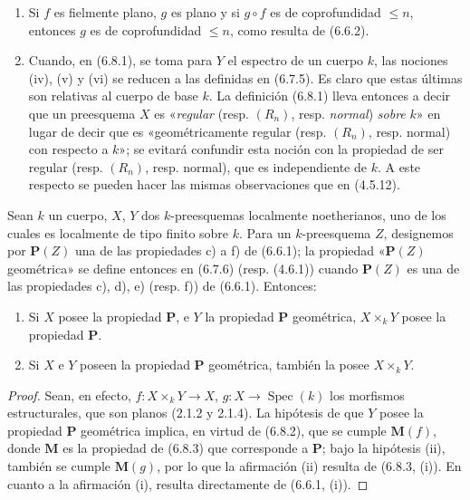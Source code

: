 \begin{remarks}[6.8.4]
\label{IV.2.s6.8.4-fr}
\begin{enumerate}
\item[(i)] Si $f$ es fielmente plano, $g$ es plano y si $g\circ f$ es de
coprofundidad $\leq n$, entonces $g$ es de coprofundidad $\leq n$, como
resulta de (6.6.2).
\item[(ii)] Cuando, en (6.8.1), se toma para $Y$ el espectro de un cuerpo
$k$, las nociones (iv), (v) y (vi) se reducen a las definidas en (6.7.5).
Es claro que estas últimas son relativas al cuerpo de base $k$. La
definición (6.8.1) lleva entonces a decir que un preesquema $X$ es «\emph{regular}
(resp. $(R_n)$, resp. \emph{normal}) \emph{sobre} $k$» en lugar de decir que es
«geométricamente regular (resp. $(R_n)$, resp. normal) con respecto a $k$»;
se evitará confundir esta noción con la propiedad de ser regular (resp.
$(R_n)$, resp. normal), que es independiente de $k$. A este respecto se
pueden hacer las mismas observaciones que en (4.5.12).
\end{enumerate}
\end{remarks}

\begin{proposition}[6.8.5]
\label{IV.2.s6.8.5-fr}
Sean $k$ un cuerpo, $X$, $Y$ dos $k$-preesquemas localmente noetherianos,
uno de los cuales es localmente de tipo finito sobre $k$. Para un $k$-preesquema $Z$,
designemos por $\boldsymbol{P}(Z)$ una de las propiedades \textup{c)} a \textup{f)} de \textup{(6.6.1)}; la propiedad
«$\boldsymbol{P}(Z)$ geométrica» se define entonces en \textup{(6.7.6) (resp. (4.6.1))} cuando
$\boldsymbol{P}(Z)$ es una de las propiedades \textup{c), d), e) (resp. f))} de \textup{(6.6.1)}. Entonces:
\begin{enumerate}
\item[\textup{(i)}] Si $X$ posee la propiedad $\boldsymbol{P}$, e $Y$ la propiedad $\boldsymbol{P}$
geométrica, $X\times_kY$ posee la propiedad $\boldsymbol{P}$.
\item[\textup{(ii)}] Si $X$ e $Y$ poseen la propiedad $\boldsymbol{P}$ geométrica, también la
posee $X\times_kY$.
\end{enumerate}
\end{proposition}

\begin{proof}
Sean, en efecto, $f:X\times_kY\to X$, $g:X\to\operatorname{Spec}(k)$ los
morfismos estructurales, que son planos (2.1.2 y 2.1.4). La hipótesis de que
$Y$ posee la propiedad $\boldsymbol{P}$ geométrica implica, en virtud de (6.8.2), que
se cumple $\boldsymbol{M}(f)$, donde $\boldsymbol{M}$ es la propiedad de (6.8.3) que corresponde a $\boldsymbol{P}$; bajo
la hipótesis (ii), también se cumple $\boldsymbol{M}(g)$, por lo que la afirmación (ii) resulta de
(6.8.3, (i)). En cuanto a la afirmación (i), resulta directamente de (6.6.1, (i)).
\end{proof}
